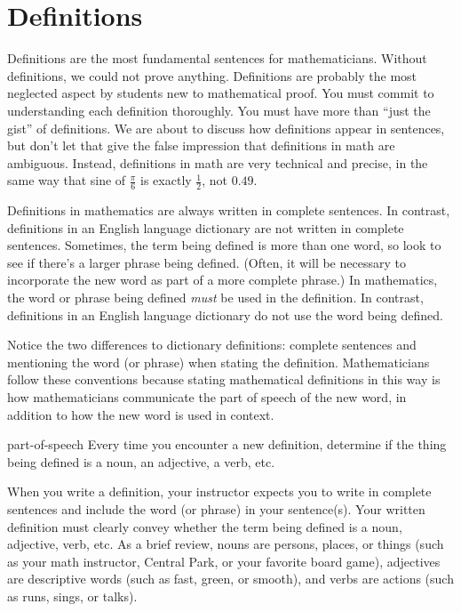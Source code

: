 \documentclass{book}
\theoremstyle{ekimcustom}
\begin{document}
\section{Definitions}\label{section:definitions}

Definitions are the most fundamental sentences for mathematicians. Without definitions, we could not prove anything. Definitions are probably the most neglected aspect by students new to mathematical proof. You must commit to understanding each definition thoroughly. You must have more than ``just the gist'' of definitions. We are about to discuss how definitions appear in sentences, but don't let that give the false impression that definitions in math are ambiguous. Instead, definitions in math are very technical and precise, in the same way that sine of $\frac\pi6$ is exactly $\frac12$, not $0.49$.

Definitions in mathematics are always written in complete sentences. In contrast, definitions in an English language dictionary are not written in complete sentences. Sometimes, the term being defined is more than one word, so look to see if there's a larger phrase being defined. (Often, it will be necessary to incorporate the new word as part of a more complete phrase.) In mathematics, the word or phrase being defined \emph{must} be used in the definition. In contrast, definitions in an English language dictionary do not use the word being defined.

Notice the two differences to dictionary definitions: complete sentences and mentioning the word (or phrase) when stating the definition.
Mathematicians follow these conventions because stating mathematical definitions in this way is how mathematicians communicate the part of speech of the new word, in addition to how the new word is used in context.
\begin{bhabit}{}{part-of-speech}
Every time you encounter a new definition, determine if the thing being defined is a noun, an adjective, a verb, etc.
\end{bhabit}
When you write a definition, your instructor expects you to write in complete sentences and include the word (or phrase) in your sentence(s). Your written definition must clearly convey whether the term being defined is a noun, adjective, verb, etc. As a brief review, nouns are persons, places, or things (such as your math instructor, Central Park, or your favorite board game), adjectives are descriptive words (such as fast, green, or smooth), and verbs are actions (such as runs, sings, or talks).
\end{document}
